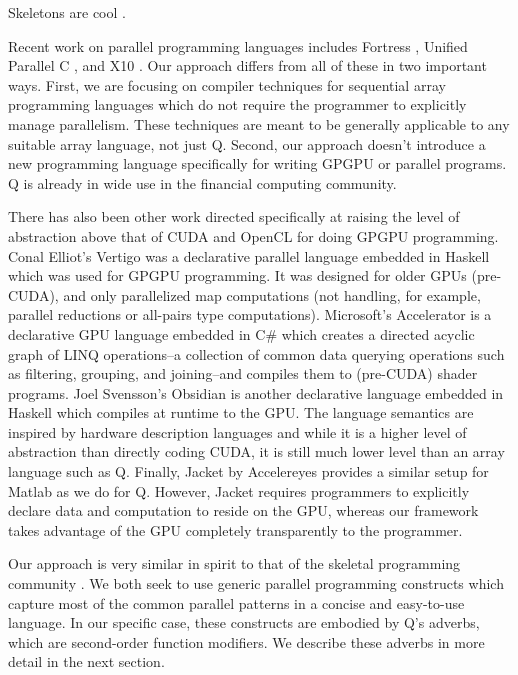 \documentclass[preprint]{sigplanconf}
\begin{document}
Skeletons are cool \cite{Cole04}.

Recent work on parallel programming languages includes Fortress \cite{Alle08},
Unified Parallel C \cite{Char05}, and X10 \cite{Chen05}.  Our approach differs
from all of these in two important ways.  First, we are focusing on compiler
techniques for sequential array programming languages which do not require the
programmer to explicitly manage parallelism.  These techniques are meant to be
generally applicable to any suitable array language, not just Q.  Second, our
approach doesn't introduce a new programming language specifically for writing
GPGPU or parallel programs.  Q is already in wide use in the financial computing
community.

There has also been other work directed specifically at raising the level of
abstraction above that of CUDA and OpenCL for doing GPGPU programming.  Conal
Elliot's Vertigo \cite{Elli04} was a declarative parallel language embedded in
Haskell which was used for GPGPU programming.  It was designed for older GPUs
(pre-CUDA), and only parallelized map computations (not handling, for example,
parallel reductions or all-pairs type computations).  Microsoft's Accelerator
\cite{Tard06} is a declarative GPU language embedded in C\# which creates a
directed acyclic graph of LINQ operations--a collection of common data querying
operations such as filtering, grouping, and joining--and compiles them to
(pre-CUDA) shader programs.  Joel Svensson's Obsidian \cite{Sven08} is another
declarative language embedded in Haskell which compiles at runtime to the GPU.
The language semantics are inspired by hardware description languages and while
it is a higher level of abstraction than directly coding CUDA, it is still much
lower level than an array language such as Q.  Finally, Jacket by Accelereyes
\cite{AcceJa} provides a similar setup for Matlab as we do for Q.  However,
Jacket requires programmers to explicitly declare data and computation to reside
on the GPU, whereas our framework takes advantage of the GPU completely
transparently to the programmer.

Our approach is very similar in spirit to that of the skeletal programming
community \cite{Cole04}.  We both seek to use generic parallel programming
constructs which capture most of the common parallel patterns in a concise and
easy-to-use language.  In our specific case, these constructs are embodied by
Q's adverbs, which are second-order function modifiers.  We describe these
adverbs in more detail in the next section.
\end{document}
